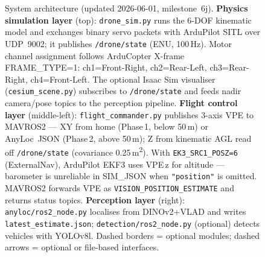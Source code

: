 \documentclass[11pt,a4paper]{article}
\begin{document}
\begin{figure}[p]
\caption{%
  System architecture (updated 2026-06-01, milestone~6j).
  \textbf{Physics simulation layer} (top): \texttt{drone\_sim.py} runs the 6-DOF kinematic
  model and exchanges binary servo packets with ArduPilot SITL over UDP~9002; it publishes
  \texttt{/drone/state} (ENU, 100\,Hz). Motor channel assignment follows ArduCopter X-frame
  FRAME\_TYPE=1: ch1=Front-Right, ch2=Rear-Left, ch3=Rear-Right, ch4=Front-Left.
  The optional Isaac Sim visualiser (\texttt{cesium\_scene.py}) subscribes to
  \texttt{/drone/state} and feeds nadir camera/pose topics to the perception pipeline.
  \textbf{Flight control layer} (middle-left): \texttt{flight\_commander.py} publishes 3-axis VPE
  to MAVROS2 --- XY from home (Phase\,1, below 50\,m) or AnyLoc~JSON (Phase\,2, above 50\,m);
  Z from kinematic AGL read off \texttt{/drone/state} (covariance 0.25\,m\textsuperscript{2}).
  With \texttt{EK3\_SRC1\_POSZ=6} (ExternalNav), ArduPilot EKF3 uses VPE\,z for altitude ---
  barometer is unreliable in SIM\_JSON when \texttt{"position"} is omitted.
  MAVROS2 forwards VPE as \texttt{VISION\_POSITION\_ESTIMATE} and returns status topics.
  \textbf{Perception layer} (right): \texttt{anyloc/ros2\_node.py} localises from DINOv2+VLAD
  and writes \texttt{latest\_estimate.json}; \texttt{detection/ros2\_node.py} (optional) detects
  vehicles with YOLOv8l.
  Dashed borders = optional modules; dashed arrows = optional or file-based interfaces.%
}
\label{fig:pipeline}
\end{figure}
\end{document}
